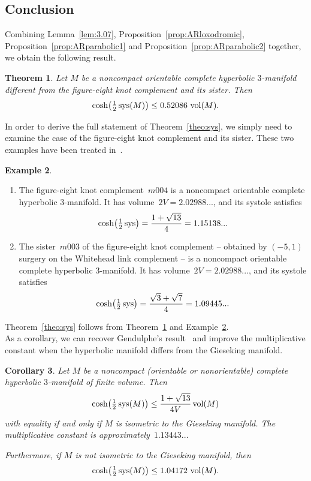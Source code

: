 \documentclass[11pt,reqno]{amsart}
\newtheorem{theorem}{Theorem}[section]
\newtheorem{corollary}[theorem]{Corollary}
\theoremstyle{definition}
\newtheorem{example}[theorem]{Example}
\numberwithin{equation}{section}
\DeclareMathOperator{\vol}{{\rm vol}}
\DeclareMathOperator{\sys}{{\rm sys}}
\numberwithin{equation}{section}
\begin{document}
\subsection{Conclusion}

Combining Lemma~\ref{lem:3.07}, Proposition~\ref{prop:ARloxodromic}, Proposition~\ref{prop:ARparabolic1} and Proposition~\ref{prop:ARparabolic2} together, we obtain the following result.

\begin{theorem} \label{theo:baby-sys}
Let $M$ be a noncompact orientable complete hyperbolic $3$-manifold different from the figure-eight knot complement and its sister.
Then
\[
\cosh \!\left(\tfrac{1}{2} \sys(M) \right) \leq 0.52086 \, \vol(M).
\]
\end{theorem}

In order to derive the full statement of Theorem~\ref{theo:sys}, we simply need to examine the case of the figure-eight knot complement and its sister.
These two examples have been treated in~\cite[\S 8.3]{GR}. 

\begin{example} \label{ex}
\mbox{ }
\begin{enumerate}
\item The figure-eight knot complement~$m004$ is a noncompact orientable complete hyperbolic $3$-manifold.
It has volume~$2 V = 2.02988...$, and its systole satisfies
\[
\cosh \!\left(\tfrac{1}{2} \sys \right) = \frac{1+\sqrt{13}}{4} = 1.15138...
\]
\item The sister~$m003$ of the figure-eight knot complement -- obtained by $(-5,1)$ surgery on the Whitehead link complement -- is a noncompact orientable complete hyperbolic $3$-manifold.
It has volume~$2 V = 2.02988...$, and its systole satisfies
\[
\cosh \!\left(\tfrac{1}{2} \sys \right) = \frac{\sqrt{3}+\sqrt{7}}{4} = 1.09445...
\]
\end{enumerate}
\end{example}
 
Theorem~\ref{theo:sys} follows from Theorem~\ref{theo:baby-sys} and Example~\ref{ex}. \\


As a corollary, we can recover Gendulphe's result~\cite{gen} and improve the multiplicative constant when the hyperbolic manifold differs from the Gieseking manifold.

\begin{corollary} \label{coro:sys}
Let $M$ be a noncompact (orientable or nonorientable) complete hyperbolic $3$-manifold of finite volume.
Then
\[
\cosh \!\left(\tfrac{1}{2} \sys(M) \right) \leq \frac{1+\sqrt{13}}{4 V} \vol(M)
\]
with equality if and only if $M$ is isometric to the Gieseking manifold.
The multiplicative constant is approximately~$1.13443...$

Furthermore, if $M$ is not isometric to the Gieseking manifold, then 
\[
\cosh \!\left(\tfrac{1}{2} \sys(M) \right) \leq 1.04172 \, \vol(M).
\]
\end{corollary}
\end{document}
